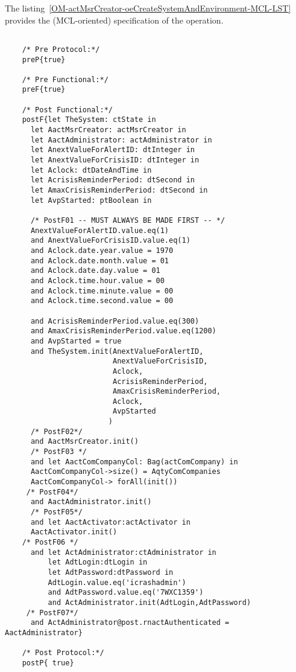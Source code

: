 \begin{operationmodel}
	\end{operationmodel}



	\vspace{1cm}
	The listing~\ref{OM-actMsrCreator-oeCreateSystemAndEnvironment-MCL-LST} provides the \msrmessir (MCL-oriented) specification of the operation.
	
	\scriptsize
	\vspace{0.5cm}
	\begin{lstlisting}[style=MessirStyle,firstnumber=auto,captionpos=b,caption={\msrmessir (MCL-oriented) specification of the operation \emph{oeCreateSystemAndEnvironment}.},label=OM-actMsrCreator-oeCreateSystemAndEnvironment-MCL-LST]

	/* Pre Protocol:*/ 
	preP{true}
	
	/* Pre Functional:*/
	preF{true}
	
	/* Post Functional:*/ 
	postF{let TheSystem: ctState in
	  let AactMsrCreator: actMsrCreator in
	  let AactAdministrator: actAdministrator in
	  let AnextValueForAlertID: dtInteger in
	  let AnextValueForCrisisID: dtInteger in
	  let Aclock: dtDateAndTime in
	  let AcrisisReminderPeriod: dtSecond in
	  let AmaxCrisisReminderPeriod: dtSecond in
	  let AvpStarted: ptBoolean in
	
	  /* PostF01 -- MUST ALWAYS BE MADE FIRST -- */ 
	  AnextValueForAlertID.value.eq(1)
	  and AnextValueForCrisisID.value.eq(1)
	  and Aclock.date.year.value = 1970 
	  and Aclock.date.month.value = 01
	  and Aclock.date.day.value = 01
	  and Aclock.time.hour.value = 00
	  and Aclock.time.minute.value = 00
	  and Aclock.time.second.value = 00
	
	  and AcrisisReminderPeriod.value.eq(300)
	  and AmaxCrisisReminderPeriod.value.eq(1200)
	  and AvpStarted = true
	  and TheSystem.init(AnextValueForAlertID,
	                     AnextValueForCrisisID,
	                     Aclock,
	                     AcrisisReminderPeriod,
	                     AmaxCrisisReminderPeriod,
	                     Aclock,
	                     AvpStarted
	                    )
	  /* PostF02*/ 
	  and AactMsrCreator.init()
	  /* PostF03 */ 
	  and let AactComCompanyCol: Bag(actComCompany) in
	  AactComCompanyCol->size() = AqtyComCompanies
	  AactComCompanyCol-> forAll(init())
	 /* PostF04*/ 
	  and AactAdministrator.init()
	  /* PostF05*/ 
	  and let AactActivator:actActivator in
	  AactActivator.init()
	/* PostF06 */ 
	  and let ActAdministrator:ctAdministrator in
	      let AdtLogin:dtLogin in
	      let AdtPassword:dtPassword in
	      AdtLogin.value.eq('icrashadmin')
	      and AdtPassword.value.eq('7WXC1359')
	      and ActAdministrator.init(AdtLogin,AdtPassword)
	 /* PostF07*/ 
	  and ActAdministrator@post.rnactAuthenticated = AactAdministrator}
	
	/* Post Protocol:*/ 
	postP{ true}
	
	\end{lstlisting}

